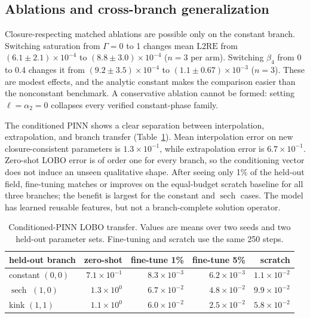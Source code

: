 \documentclass[11pt]{article}
\newcommand{\Ltwo}{\mathrm{L2RE}}
\newcommand{\sech}{\operatorname{sech}}
\begin{document}
\subsection{Ablations and cross-branch generalization}

Closure-respecting matched ablations are possible only on the constant branch.
Switching saturation from $\Gamma=0$ to 1 changes mean $\Ltwo$ from
$(6.1\pm2.1)\times10^{-4}$ to $(8.8\pm3.0)\times10^{-4}$ ($n=3$ per arm).
Switching $\beta_4$ from 0 to 0.4 changes it from
$(9.2\pm3.5)\times10^{-4}$ to $(1.1\pm0.67)\times10^{-3}$ ($n=3$).  These are
modest effects, and the analytic constant makes the comparison easier than the
nonconstant benchmark.  A conservative ablation cannot be formed: setting
$\ell=\alpha_2=0$ collapses every verified constant-phase family.

The conditioned PINN shows a clear separation between interpolation,
extrapolation, and branch transfer (Table~\ref{tab:generalization}).  Mean
interpolation error on new closure-consistent parameters is
$1.3\times10^{-1}$, while extrapolation error is $6.7\times10^{-1}$.
Zero-shot LOBO error is of order one for every branch, so the conditioning
vector does not induce an unseen qualitative shape.  After seeing only 1\% of
the held-out field, fine-tuning matches or improves on the equal-budget scratch
baseline for all three branches; the benefit is largest for the constant and
$\sech$ cases.  The model has learned reusable features, but not a
branch-complete solution operator.

\begin{table}[t]
\centering
\caption{Conditioned-PINN LOBO transfer.  Values are means over two seeds and
two held-out parameter sets.  Fine-tuning and scratch use the same 250 steps.}
\label{tab:generalization}
\small
\begin{tabular}{lrrrr}
\toprule
held-out branch & zero-shot & fine-tune 1\% & fine-tune 5\% & scratch \\
\midrule
constant $(0,0)$ & $7.1\times10^{-1}$ & $8.3\times10^{-3}$ & $6.2\times10^{-3}$ & $1.1\times10^{-2}$ \\
$\sech$ $(1,0)$  & $1.3\times10^{0}$  & $6.7\times10^{-2}$ & $4.8\times10^{-2}$ & $9.9\times10^{-2}$ \\
kink $(1,1)$     & $1.1\times10^{0}$  & $6.0\times10^{-2}$ & $2.5\times10^{-2}$ & $5.8\times10^{-2}$ \\
\bottomrule
\end{tabular}
\end{table}
\end{document}
